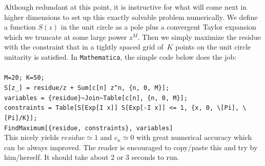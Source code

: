 \documentclass[12pt]{article}
\newcommand{\<}{{\langle}}
\renewcommand{\>}{{\rangle}}
\def\[{\left[}
\def\[{\left[}
\begin{document}
Although redundant at this point, it is instructive for what will come next in higher dimensions to set up this exactly solvable problem numerically. We define a function $S(z)$ in the unit circle as a pole plus a convergent Taylor expansion which we truncate at some large power $z^M$. Then we simply maximize the residue with the constraint that in a tightly spaced grid of~$K$ points on the unit circle  unitarity is satisfied. In \texttt{Mathematica}, the simple code below does the job: \\ \\
\noindent
\verb"M=20; K=50;" \\
\verb"S[z_] = residue/z + Sum[c[n] z^n, {n, 0, M}];" \\
\verb"variables = {residue}~Join~Table[c[n], {n, 0, M}];"\\
\verb"constraints = Table[S[Exp[I x]] S[Exp[-I x]] <= 1, {x, 0, \[Pi], \[Pi]/K}];" \\
\verb"FindMaximum[{residue, constraints}, variables]"  \\

\noindent
This nicely yields $residue\simeq 1$ and $c_n \simeq 0$ with great numerical accuracy which can be always improved. The reader is encouraged to copy/paste this and try by him/herself. It should take about $2$ or $3$ seconds to run.
\end{document}
